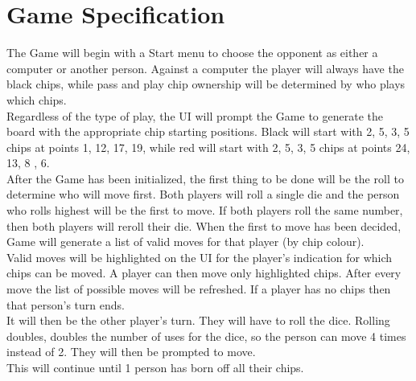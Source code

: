 \newpage

\appendix

\chapter{Game Specification}

The Game will begin with a Start menu to choose the opponent as either a computer or another person. Against a computer the player will always have the black chips, while pass and play chip ownership will be determined by who plays which chips. \\
Regardless of the type of play, the UI will prompt the Game to generate the board with the appropriate chip starting positions. Black will start with 2, 5, 3, 5 chips at points 1, 12, 17, 19, while red will start with 2, 5, 3, 5 chips at points 24, 13, 8 , 6. \\
After the Game has been initialized, the first thing to be done will be the roll to determine who will move first. Both players will roll a single die and the person who rolls highest will be the first to move. If both players roll the same number, then both players will reroll their die. When the first to move has been decided, Game will generate a list of valid moves for that player (by chip colour). \\
Valid moves will be highlighted on the UI for the player's indication for which chips can be moved. A player can then move only highlighted chips. After every move the list of possible moves will be refreshed. If a player has no chips then that person's turn ends. \\
It will then be the other player's turn. They will have to roll the dice. Rolling doubles, doubles the number of uses for the dice, so the person can move 4 times instead of 2. They will then be prompted to move. \\
This will continue until 1 person has born off all their chips.


